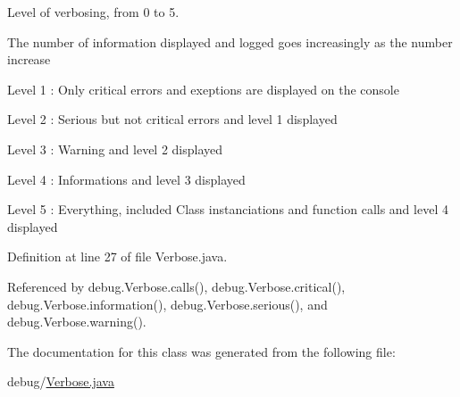 Level of verbosing, from 0 to 5. 

The number of information displayed and logged goes increasingly as the number increase
\begin{DoxyItemize}
\item Level 1 \-: Only critical errors and exeptions are displayed on the console
\item Level 2 \-: Serious but not critical errors and level 1 displayed
\item Level 3 \-: Warning and level 2 displayed
\item Level 4 \-: Informations and level 3 displayed
\item Level 5 \-: Everything, included Class instanciations and function calls and level 4 displayed 
\end{DoxyItemize}

Definition at line 27 of file Verbose.\-java.



Referenced by debug.\-Verbose.\-calls(), debug.\-Verbose.\-critical(), debug.\-Verbose.\-information(), debug.\-Verbose.\-serious(), and debug.\-Verbose.\-warning().



The documentation for this class was generated from the following file\-:\begin{DoxyCompactItemize}
\item 
debug/\hyperlink{_verbose_8java}{Verbose.\-java}\end{DoxyCompactItemize}

